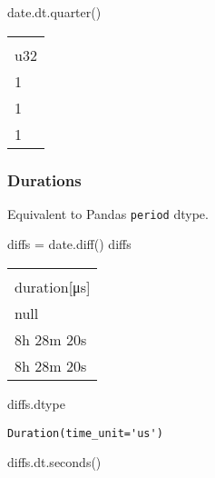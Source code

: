\documentclass[
  letterpaper,
  DIV=11,
  numbers=noendperiod]{scrartcl}
\newenvironment{Shaded}{\begin{snugshade}}{\end{snugshade}}
\newcommand{\NormalTok}[1]{\textcolor[rgb]{0.00,0.23,0.31}{#1}}
\newcommand{\OperatorTok}[1]{\textcolor[rgb]{0.37,0.37,0.37}{#1}}
\begin{document}
\begin{Shaded}
\begin{Highlighting}[]
\NormalTok{date.dt.quarter()}
\end{Highlighting}
\end{Shaded}

\begin{longtable}[]{@{}l@{}}
\toprule()
 \\
u32 \\
\midrule()
\endhead
1 \\
1 \\
1 \\
\bottomrule()
\end{longtable}

\hypertarget{durations}{%
\subsubsection{Durations}\label{durations}}

Equivalent to Pandas \texttt{period} dtype.

\begin{Shaded}
\begin{Highlighting}[]
\NormalTok{diffs }\OperatorTok{=}\NormalTok{ date.diff()}
\NormalTok{diffs}
\end{Highlighting}
\end{Shaded}

\begin{longtable}[]{@{}l@{}}
\toprule()
 \\
duration{[}μs{]} \\
\midrule()
\endhead
null \\
8h 28m 20s \\
8h 28m 20s \\
\bottomrule()
\end{longtable}

\begin{Shaded}
\begin{Highlighting}[]
\NormalTok{diffs.dtype}
\end{Highlighting}
\end{Shaded}

\begin{verbatim}
Duration(time_unit='us')
\end{verbatim}

\begin{Shaded}
\begin{Highlighting}[]
\NormalTok{diffs.dt.seconds()}
\end{Highlighting}
\end{Shaded}
\end{document}
